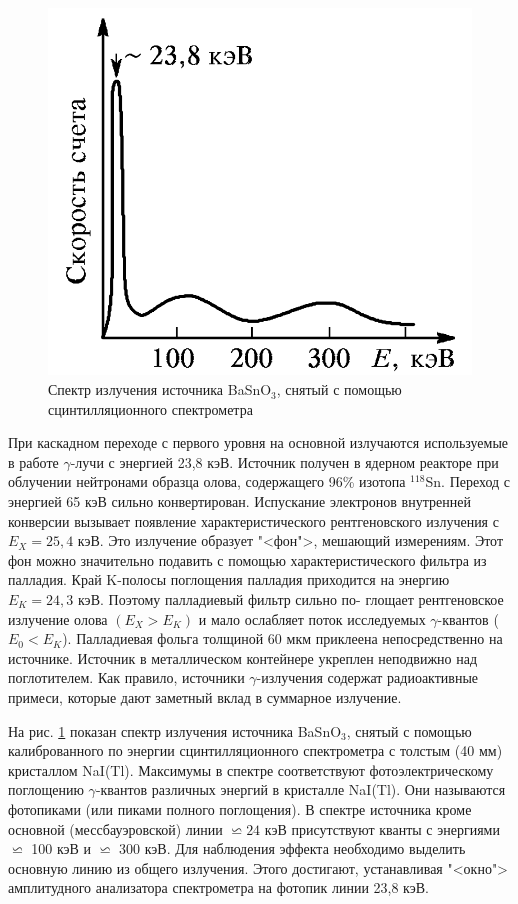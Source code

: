 \documentclass[12pt]{kiarticle}
\begin{document}
	\begin{figure}
		\includegraphics[width=\linewidth]{spek_lab}
		\caption{Спектр излучения источника BaSnO$_3 $, снятый с
			помощью сцинтилляционного спектрометра}
		\label{spek_lab}
	\end{figure}
	
	
	При каскадном переходе с первого
	уровня на основной излучаются используемые в работе $ \gamma $-лучи с энергией 23,8 кэВ.
	Источник получен в ядерном реакторе при
	облучении нейтронами образца олова, содержащего 96\% изотопа
	$ ^{118} $Sn. Переход с энергией 65 кэВ сильно конвертирован. Испускание электронов внутренней конверсии вызывает появление характеристического рентгеновского излучения с $ E_X = 25,4 $ кэВ. Это излучение образует "<фон">, мешающий измерениям. Этот фон можно значительно подавить с помощью характеристического фильтра
	из палладия. Край K-полосы поглощения палладия приходится на
	энергию $ E_K = 24,3 $ кэВ. Поэтому палладиевый фильтр сильно по-
	глощает рентгеновское излучение олова $ (E_X > E_K) $ и мало ослабляет поток исследуемых $ \gamma $-квантов ($ E_0 < E_K $). Палладиевая фольга
	толщиной 60 мкм приклеена непосредственно на источнике. Источник в металлическом контейнере укреплен неподвижно над поглотителем. Как правило, источники $ \gamma $-излучения содержат радиоактивные примеси, которые дают заметный вклад в суммарное излучение.

	На рис. \ref{spek_lab} показан спектр излучения источника BaSnO$_3 $, снятый с помощью калиброванного по энергии сцинтилляционного спектрометра с толстым (40 мм) кристаллом NaI(Tl). Максимумы в спектре
	соответствуют фотоэлектрическому поглощению $ \gamma $-квантов различных энергий в кристалле NaI(Tl). Они называются фотопиками (или
	пиками полного поглощения). В спектре источника кроме основной
	(мессбауэровской) линии $ \backsimeq 24 $ кэВ присутствуют кванты с энергиями $ \backsimeq $ 100 кэВ и $ \backsimeq  $ 300 кэВ. Для наблюдения эффекта необходимо выделить основную линию из общего излучения. Этого достигают, устанавливая "<окно"> амплитудного анализатора спектрометра на фотопик линии 23,8 кэВ.
	
\end{document}
